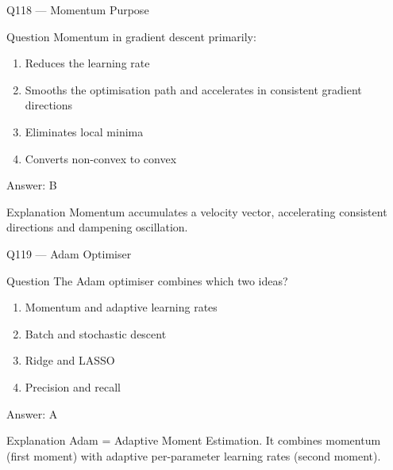 \documentclass[aspectratio=169,8pt]{beamer}
\begin{document}
	\begin{frame}{Q118 --- Momentum Purpose}
		\begin{block}{Question}
			Momentum in gradient descent primarily:
			\begin{enumerate}
				\item Reduces the learning rate
				\item Smooths the optimisation path and accelerates in consistent gradient directions
				\item Eliminates local minima
				\item Converts non-convex to convex
			\end{enumerate}
		\end{block}
		\begin{exampleblock}{Answer: B}\end{exampleblock}
		\begin{block}{Explanation}
			Momentum accumulates a velocity vector, accelerating consistent directions and dampening oscillation.
		\end{block}
	\end{frame}
	
	\begin{frame}{Q119 --- Adam Optimiser}
		\begin{block}{Question}
			The Adam optimiser combines which two ideas?
			\begin{enumerate}
				\item Momentum and adaptive learning rates
				\item Batch and stochastic descent
				\item Ridge and LASSO
				\item Precision and recall
			\end{enumerate}
		\end{block}
		\begin{exampleblock}{Answer: A}\end{exampleblock}
		\begin{block}{Explanation}
			Adam = Adaptive Moment Estimation. It combines momentum (first moment) with adaptive per-parameter learning rates (second moment).
		\end{block}
	\end{frame}
	
\end{document}
